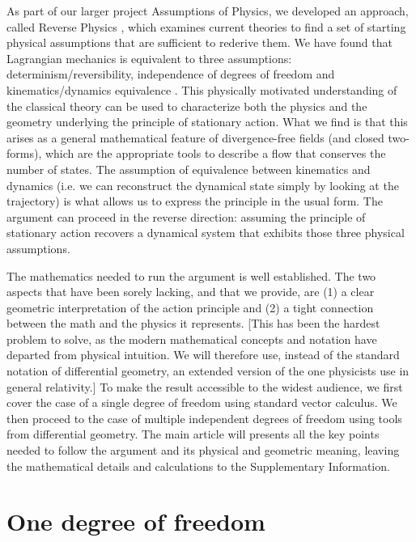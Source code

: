 \documentclass[fleqn,10pt]{wlscirep}
\begin{document}
As part of our larger project Assumptions of Physics, we developed an approach, called Reverse Physics \cite{aop-phys-ReversePhysics}, which examines current theories to find a set of starting physical assumptions that are sufficient to rederive them. We have found that Lagrangian mechanics is equivalent to three assumptions: determinism/reversibility, independence of degrees of freedom and kinematics/dynamics equivalence \cite{aop-phys-blueprint}. This physically motivated understanding of the classical theory can be used to characterize both the physics and the geometry underlying the principle of stationary action. What we find is that this arises as a general mathematical feature of divergence-free fields (and closed two-forms), which are the appropriate tools to describe a flow that conserves the number of states. The assumption of equivalence between kinematics and dynamics (i.e. we can reconstruct the dynamical state simply by looking at the trajectory) is what allows us to express the principle in the usual form. The argument can proceed in the reverse direction: assuming the principle of stationary action recovers a dynamical system that exhibits those three physical assumptions.

The mathematics needed to run the argument is well established\cite{souriau1970structure, abraham1978foundations,arnold1989mathematical, marsden1999introduction}. The two aspects that have been sorely lacking, and that we provide, are (1) a clear geometric interpretation of the action principle and (2) a tight connection between the math and the physics it represents. [This has been the hardest problem to solve, as the modern mathematical concepts and notation have departed from physical intuition. We will therefore use, instead of the standard notation of differential geometry, an extended version of the one physicists use in general relativity.] To make the result accessible to the widest audience, we first cover the case of a single degree of freedom using standard vector calculus. We then proceed to the case of multiple independent degrees of freedom using tools from differential geometry. The main article will presents all the key points needed to follow the argument and its physical and geometric meaning, leaving the mathematical details and calculations to the Supplementary Information.

\section*{One degree of freedom}
\end{document}
